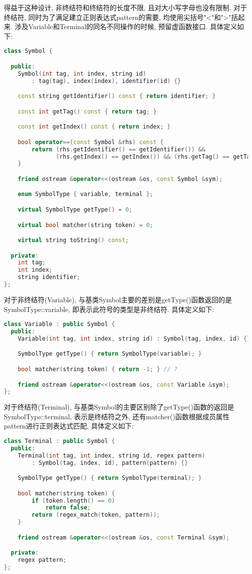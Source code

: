 得益于这种设计, 非终结符和终结符的长度不限, 且对大小写字母也没有限制.
对于终结符, 同时为了满足建立正则表达式pattern的需要, 均使用尖括号"<"和">"括起来.
涉及Variable和Terminal的同名不同操作的时候, 预留虚函数接口. 具体定义如下:
\begin{lstlisting}[language=c++]
class Symbol {

  public:
    Symbol(int tag, int index, string id)
        : tag(tag), index(index), identifier(id) {}

    const string getIdentifier() const { return identifier; }

    const int getTag() const { return tag; }

    const int getIndex() const { return index; }

    bool operator==(const Symbol &rhs) const {
        return (rhs.getIdentifier() == getIdentifier()) &&
               (rhs.getIndex() == getIndex()) && (rhs.getTag() == getTag());
    }

    friend ostream &operator<<(ostream &os, const Symbol &sym);

    enum SymbolType { variable, terminal };

    virtual SymbolType getType() = 0;

    virtual bool matcher(string token) = 0;

    virtual string toString() const;

  private:
    int tag;
    int index;
    string identifier;
};
\end{lstlisting}

对于非终结符(Variable),
与基类Symbol主要的差别是getType()函数返回的是SymbolType::variable,
即表示此符号的类型是非终结符. 具体定义如下:
\begin{lstlisting}[language=c++]
class Variable : public Symbol {
  public:
    Variable(int tag, int index, string id) : Symbol(tag, index, id) {}

    SymbolType getType() { return SymbolType(variable); }

    bool matcher(string token) { return -1; } // ?

    friend ostream &operator<<(ostream &os, const Variable &sym);
};
\end{lstlisting}

对于终结符(Terminal),
与基类Symbol的主要区别除了getType()函数的返回是SymbolType::terminal,
表示是终结符之外, 还有matcher()函数根据成员属性pattern进行正则表达式匹配,
具体定义如下:

\begin{lstlisting}[language=c++]
class Terminal : public Symbol {
  public:
    Terminal(int tag, int index, string id, regex pattern)
        : Symbol(tag, index, id), pattern(pattern) {}

    SymbolType getType() { return SymbolType(terminal); }

    bool matcher(string token) {
        if (token.length() == 0)
            return false;
        return (regex_match(token, pattern));
    }

    friend ostream &operator<<(ostream &os, const Terminal &sym);

  private:
    regex pattern;
};
\end{lstlisting}

